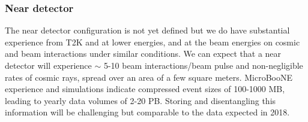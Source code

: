 \subsubsection{ Near detector} The near detector configuration is not yet defined  but we do have substantial experience from T2K and   at lower energies, and   at the   beam energies on cosmic and beam interactions under similar conditions.  We can expect that a near detector will experience $\sim$ 5-10 beam interactions/beam pulse and non-negligible rates of cosmic rays, spread over an area of a few square meters. MicroBooNE experience and  simulations indicate compressed event sizes of 100-1000 MB, leading to yearly data volumes of 2-20 PB.  Storing and disentangling this information will be challenging but comparable to the  data expected in 2018.%




%


